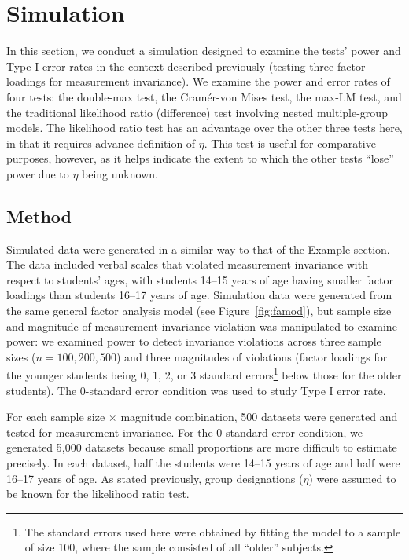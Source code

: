 \documentclass[man]{apa}
\begin{document}
\section{Simulation}
In this section, we conduct a simulation designed to
examine the tests' power and Type I error rates in the context
described previously (testing three factor loadings for measurement
invariance).  We 
examine the power and error rates of four tests: the double-max test, the
Cram\'{e}r-von Mises test, the max-LM test, and the traditional likelihood
ratio (difference) test involving nested 
multiple-group models.  The likelihood ratio test has an advantage over the
other three tests here, in that it requires advance definition of
$\eta$.  This test is useful for comparative purposes,
however, as it helps indicate the extent to which the other tests
``lose'' power due to $\eta$ being unknown.

\subsection{Method}
Simulated data were generated in a similar way to that of 
the Example section.
The data included verbal scales that violated measurement invariance
with respect to students' ages, with students 14--15 years of age
having smaller factor loadings than students 16--17 years of age.  
Simulation data were generated from the same general factor analysis
model (see Figure~\ref{fig:famod}), but sample size and magnitude
of measurement 
invariance violation was manipulated to examine power:
we examined power to detect 
invariance violations across three sample sizes ($n=100,
200, 500$) and three magnitudes of violations (factor loadings
for the younger students being 0, 1, 2, or 3 standard
errors\footnote{The standard errors used here were
  obtained by fitting
  the model to a sample of size 100, where the sample consisted of all
  ``older'' subjects.} below 
those for the older students).  The 0-standard error condition was
used to study Type I error rate.

For each sample size $\times$
magnitude combination, 500 datasets were generated and tested for
measurement invariance.  For the 0-standard error condition, we
generated 5,000 datasets because small proportions are more
 difficult to estimate precisely.  In each dataset, half the
students were 14--15 
years of age and half were 16--17 years of age.  As stated previously,
group
designations ($\eta$) were assumed to be
known for the likelihood ratio test.
\end{document}
